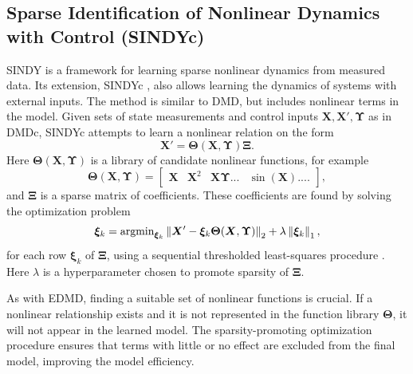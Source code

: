 \documentclass[../main.tex]{subfiles}
\begin{document}
\subsection{Sparse Identification of Nonlinear Dynamics with Control (SINDYc)}
\label{sec:SINDY}
SINDY \cite{brunton2016} is a framework for learning sparse nonlinear dynamics from measured data. Its extension, SINDYc \cite{brunton2016a}, also allows learning the dynamics of systems with external inputs. The method is similar to DMD, but includes nonlinear terms in the model.
Given sets of state measurements and control inputs $\bm{X}, \bm{X}', \bm{\Upsilon}$ as in DMDc, SINDYc attempts to learn a nonlinear relation on the form
\begin{equation}
    \bm{X}' = \bm{\Theta}(\bm{X}, \bm{\Upsilon}) \bm{\Xi}.
\end{equation}
Here $\bm{\Theta}(\bm{X}, \bm{\Upsilon})$ is a library of candidate nonlinear functions, for example
\begin{equation}
    \bm{\Theta}(\bm{X}, \bm{\Upsilon}) =
    \begin{bmatrix}
        \bm{X} & \bm{X}^2 & \bm{X}\bm{\Upsilon}... &\sin(\bm{X}) ....
    \end{bmatrix},
\end{equation}
and $\bm{\Xi}$ is a sparse matrix of coefficients. These coefficients are found by solving the optimization problem
\begin{equation}
    \label{eq:sindy_optimization}
    \bm{\xi}_k = \text{argmin}_{\bm{\xi}_k} \left\lVert\bm{X}' - \bm{\xi}_k \bm{\Theta}(\bm{X}, \bm{\Upsilon}) \right\rVert_2 + \lambda \left\lVert\bm{\xi}_k\right\rVert_1,
\end{equation}
for each row $\bm{\xi}_k$ of $\bm{\Xi}$, using a sequential thresholded least-squares procedure \cite{brunton2016}. Here $\lambda$ is a hyperparameter chosen to promote sparsity of $\bm{\Xi}$. 


As with EDMD, finding a suitable set of nonlinear functions is crucial. If a nonlinear relationship exists and it is not represented in the function library $\bm{\Theta}$, it will not appear in the learned model. The sparsity-promoting optimization procedure ensures that terms with little or no effect are excluded from the final model, improving the model efficiency. 
\end{document}
